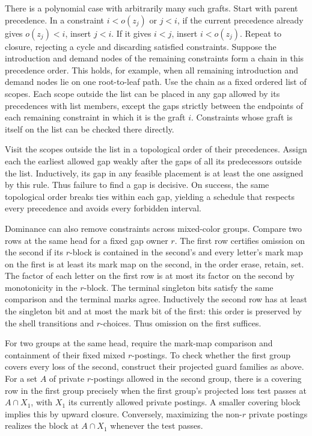 There is a polynomial case with arbitrarily many such grafts. Start
with parent precedence. In a constraint $i<o(z_j)$ or $j<i$, if the
current precedence already gives $o(z_j)<i$, insert $j<i$. If it gives
$i<j$, insert $i<o(z_j)$. Repeat to closure, rejecting a cycle and
discarding satisfied constraints. Suppose the introduction and demand
nodes of the remaining constraints form a chain in this precedence
order. This holds, for example, when all remaining introduction and
demand nodes lie on one root-to-leaf path. Use the chain as a fixed
ordered list of scopes. Each scope outside the list can be placed in
any gap allowed by its precedences with list members, except the gaps
strictly between the endpoints of each remaining constraint in which
it is the graft $i$. Constraints whose graft is itself on the list
can be checked there directly.

Visit the scopes outside the list in a topological order of their
precedences. Assign each the earliest allowed gap weakly after the
gaps of all its predecessors outside the list. Inductively, its gap
in any feasible placement is at least the one assigned by this rule.
Thus failure to find a gap is decisive. On success, the same
topological order breaks ties within each gap, yielding a schedule
that respects every precedence and avoids every forbidden interval.

Dominance can also remove constraints across mixed-color
groups. Compare two rows at the same head for a fixed
gap owner $r$. The first row certifies omission on the
second if its $r$-block is contained in the second's and
every letter's mark map on the first is at least its
mark map on the second, in the order erase, retain,
set. The factor of each letter on the first row is
at most its factor on the second by monotonicity in
the $r$-block. The terminal singleton bits satisfy
the same comparison and the terminal marks agree.
Inductively the second row has at least the singleton
bit and at most the mark bit of the first: this order
is preserved by the shell transitions and $r$-choices.
Thus omission on the first suffices.

For two groups at the same head, require the mark-map
comparison and containment of their fixed mixed
$r$-postings. To check whether the first group covers
every loss of the second, construct their projected
guard families as above. For a set $A$ of private
$r$-postings allowed in the second group, there is a
covering row in the first group precisely when the
first group's projected loss test passes at
$A\cap X_1$, with $X_1$ its currently allowed private
postings. A smaller covering block implies this by
upward closure. Conversely, maximizing the non-$r$
private postings realizes the block at $A\cap X_1$
whenever the test passes.

